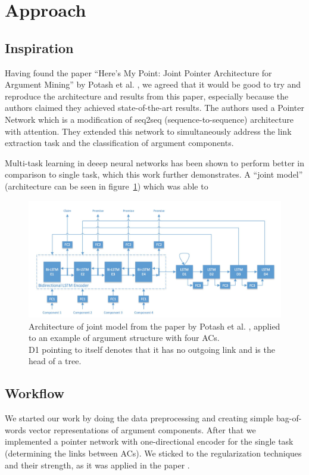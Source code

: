 \documentclass[onecolumn]{article}
\begin{document}
\section{Approach}
\subsection{Inspiration}
Having found the paper ``Here's My Point: Joint Pointer Architecture for Argument Mining'' by Potash et al. \cite{potash2017here}, we agreed that it
would be good to try and reproduce the architecture and results from this paper, especially because the authors claimed they achieved
state-of-the-art results. The authors used a Pointer Network which is a modification of seq2seq (sequence-to-sequence) architecture with attention.
They extended this network to simultaneously address the link extraction task and the classification of argument components.

Multi-task learning in deeep neural networks has been shown to perform better in comparison to single task, which this work further demonstrates.
A ``joint model'' (architecture can be seen in figure~\ref{fig:joint}) which was able to

\begin{figure}[h]
    \centering
    \includegraphics[width=0.8\linewidth]{fig/joint.png}
    \caption{Architecture of joint model from the paper by Potash et al. \cite{potash2017here}, applied to an example of argument structure with four ACs.
            \\D1 pointing to itself denotes that it has no outgoing link and is the head of a tree.}
    \label{fig:joint}
        \end{figure}

\subsection{Workflow}
We started our work by doing the data preprocessing and creating simple bag-of-words vector representations of argument components. 
After that we implemented a pointer network with one-directional encoder for the single task (determining the links between ACs).
We sticked to the regularization techniques and their strength, as it was applied in the paper \cite{potash2017here}. 
\end{document}
